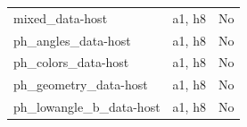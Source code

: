 \begin{longtable}{>{\raggedright\arraybackslash}p{.47\linewidth}>{\raggedright\arraybackslash}p{.25\linewidth}l}
mixed\_\allowbreak{}data-host & %
a1, h8 & %
No \\ %

ph\_\allowbreak{}angles\_\allowbreak{}data-host & %
a1, h8 & %
No \\ %

ph\_\allowbreak{}colors\_\allowbreak{}data-host & %
a1, h8 & %
No \\ %

ph\_\allowbreak{}geometry\_\allowbreak{}data-host & %
a1, h8 & %
No \\ %

ph\_\allowbreak{}lowangle\_\allowbreak{}b\_\allowbreak{}data-host & %
a1, h8 & %
No \\ %


\end{longtable}
